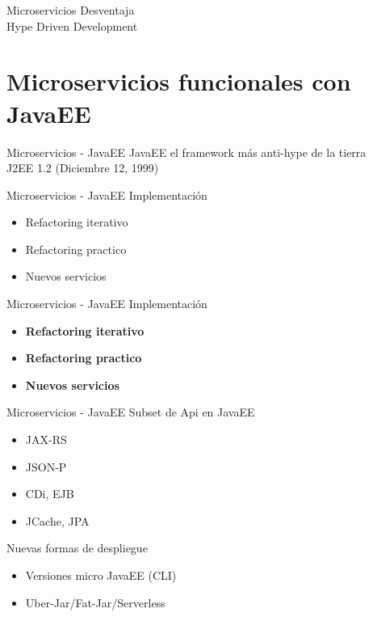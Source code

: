 \documentclass{beamer}
\begin{document}
\begin{frame}{Microservicios}
Desventaja \\

\huge Hype Driven Development
\end{frame}

\section{Microservicios funcionales con JavaEE}
\begin{frame}{Microservicios - JavaEE}
JavaEE el framework más anti-hype de la tierra\\

\huge J2EE 1.2 (Diciembre 12, 1999)
\end{frame}


\begin{frame}{Microservicios - JavaEE}
Implementación
\begin{itemize}
	\item Refactoring iterativo
	\item Refactoring practico
	\item Nuevos servicios
\end{itemize}
\end{frame}

\begin{frame}{Microservicios - JavaEE}
Implementación
\begin{itemize}
	\item \textbf{Refactoring iterativo}
	\item \textbf{Refactoring practico}
	\item \textbf{Nuevos servicios}
\end{itemize}
\end{frame}

\begin{frame}{Microservicios - JavaEE}
Subset de Api en JavaEE
\begin{itemize}
	\item JAX-RS
	\item JSON-P
	\item CDi, EJB
	\item JCache, JPA
\end{itemize}

Nuevas formas de despliegue
\begin{itemize}
	\item Versiones micro JavaEE (CLI)
	\item Uber-Jar/Fat-Jar/Serverless
\end{itemize}
\end{frame}
\end{document}
